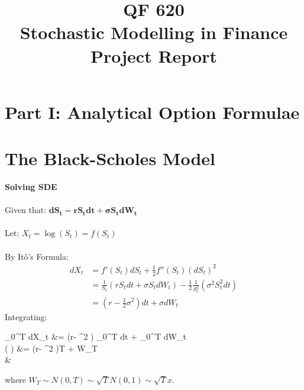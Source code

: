 \documentclass{article}
\title{QF 620 \protect \\ Stochastic Modelling in Finance\\
	\textbf{Project Report}}
\date{}
\begin{document}
	
\section*{Part I: Analytical Option Formulae}
\section{The Black-Scholes Model}
\begin{minipage}[t]{0.5\textwidth}
	\begin{tcolorbox}[height=11.5cm,boxsep=5pt,arc=0pt,auto outer arc,colback=white,colframe=black]
		\noindent \textbf{Solving SDE}\\ \\
		\noindent Given that: $\boldsymbol{dS_t = r S_t dt + \sigma S_t dW_t}$\\ \\
		\noindent Let: $X_t = \log (S_t) = f(S_t)$\\ \\
		\noindent By Itô's Formula:
		\begin{align*}
		dX_t &= f'(S_t) dS_t + \frac{1}{2} f''(S_t) (dS_t)^2\\
		&= \frac{1}{S_t} (r S_t dt + \sigma S_t dW_t) - \frac{1}{2} \frac{1}{S_t^2} (\sigma^2 S_t^2 dt)\\
		&= \left(r-\frac{1}{2} \sigma^2 \right) dt + \sigma dW_t
		\end{align*}
		\noindent Integrating:
		\begin{flalign*}
		\int_{0}^{T} dX_t &= \left(r- \sigma^2 \right) \int_{0}^{T} dt +  \sigma \int_{0}^{T} dW_t\\
		\log \left(  \right) &= \left(r- \sigma^2 \right)T + \sigma W_T\\
		&
		\end{flalign*}
		\noindent where $W_T \sim N(0,T) \sim \sqrt{T} N(0,1) \sim \sqrt{T} x$.
	\end{tcolorbox}
\end{minipage}
\end{document}
